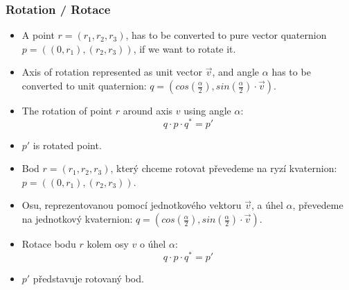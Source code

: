 \begin{frame}\frametitle{Rotation / Rotace}\scriptsize
\begin{itemize}
\item A point $r=(r_1,r_2,r_3)$, has to be converted to pure vector quaternion $p=((0,r_1),(r_2,r_3))$, if we want to rotate it.
\item Axis of rotation represented as unit vector $\vec v$, and angle $\alpha$ has to be converted to unit quaternion: $q=(cos(\frac{\alpha}{2}),sin(\frac{\alpha}{2})\cdot\vec v)$.
\item The rotation of point $r$ around axis $v$ using angle $\alpha$:
$$q\cdot p \cdot q^*=p'$$
\item $p'$ is rotated point.
\end{itemize}

\begin{itemize}
\item Bod $r=(r_1,r_2,r_3)$, který chceme rotovat převedeme na ryzí kvaternion: $p=((0,r_1),(r_2,r_3))$.
\item Osu, reprezentovanou pomocí jednotkového vektoru $\vec v$, a úhel $\alpha$, převedeme na jednotkový kvaternion: $q=(cos(\frac{\alpha}{2}),sin(\frac{\alpha}{2})\cdot\vec v)$.
\item Rotace bodu $r$ kolem osy $v$ o úhel $\alpha$:
$$q\cdot p \cdot q^*=p'$$
\item $p'$ představuje rotovaný bod.
\end{itemize}
\end{frame}

